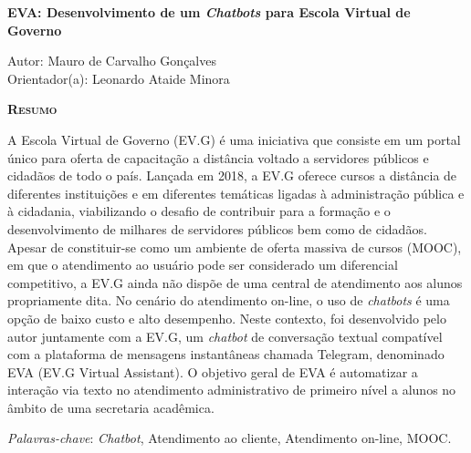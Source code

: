 \begin{center}
	{\Large{\textbf{EVA: Desenvolvimento de um \textit{Chatbots} para Escola Virtual de Governo}}}
\end{center}

\vspace{1cm}

\begin{flushright}
	Autor: Mauro de Carvalho Gonçalves\\
	Orientador(a): Leonardo Ataide Minora
\end{flushright}

\vspace{1cm}

\begin{center}
	\Large{\textsc{\textbf{Resumo}}}
\end{center}

\noindent A Escola Virtual de Governo (EV.G) é uma iniciativa que consiste em um portal único para oferta de capacitação a distância voltado a servidores públicos e cidadãos de todo o país.
Lançada em 2018, a EV.G oferece cursos a distância de diferentes instituições e em diferentes temáticas ligadas à administração pública e à cidadania, viabilizando o desafio de contribuir para a formação e o desenvolvimento de milhares de servidores públicos bem como de cidadãos.
Apesar de constituir-se como um ambiente de oferta massiva de cursos (MOOC), em que o atendimento ao usuário pode ser considerado um diferencial competitivo, a EV.G ainda não dispõe de uma central de atendimento aos alunos propriamente dita.
No cenário do atendimento on-line, o uso de \textit{chatbots} é uma opção de baixo custo e alto desempenho. 
Neste contexto, foi desenvolvido pelo autor juntamente com a EV.G, um \textit{chatbot} de conversação textual compatível com a plataforma de mensagens instantâneas chamada Telegram, denominado EVA (EV.G Virtual Assistant). O objetivo geral de EVA é automatizar a interação via texto no atendimento administrativo de primeiro nível a alunos no âmbito de uma secretaria acadêmica.


\noindent\textit{Palavras-chave}: \textit{Chatbot}, Atendimento ao cliente, Atendimento on-line, MOOC.